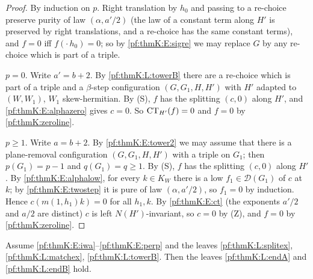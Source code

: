 \begin{proof}
By induction on $p$. Right translation by $h_0$ and passing to a re-choice preserve purity of law $(\alpha,a'/2)$ (the law
of a constant term along $H'$ is preserved by right translations, and a re-choice has the same constant terms), and $f=0$ iff
$f(\cdot\,h_0)=0$; so by \ref{pf:thmK:E:sigre} we may replace $G$ by any re-choice which is part of a triple.

$p=0$. Write $a'=b+2$. By \ref{pf:thmK:L:towerB} there are a re-choice which is part of a triple and a $\beta$-step
configuration $(G,G_1,H,H')$ with $H'$ adapted to $(W,W_1)$, $W_1$ skew-hermitian. By (S), $f$ has the splitting $(c,0)$ along
$H'$, and \ref{pf:thmK:E:alphazero} gives $c=0$. So $\operatorname{CT}_{H'}(f)=0$ and $f=0$ by \cref{pf:thmK:zeroline}.

$p\ge1$. Write $a=b+2$. By \ref{pf:thmK:E:tower2} we may assume that there is a plane-removal configuration $(G,G_1,H,H')$
with a triple on $G_1$; then $p(G_1)=p-1$ and $q(G_1)=q\ge1$. By (S), $f$ has the splitting $(c,0)$ along $H'$. By
\ref{pf:thmK:E:alphalow}, for every $k\in K_W$ there is a low $f_1\in\mathcal D(G_1)$ of $c$ at $k$; by
\ref{pf:thmK:E:twostep} it is pure of law $(\alpha,a'/2)$, so $f_1=0$ by induction. Hence $c(m(1,h_1)k)=0$ for all $h_1,k$.
By \ref{pf:thmK:E:ct} (the exponents $a'/2$ and $a/2$ are distinct) $c$ is left $N(H')$-invariant, so $c=0$ by (Z), and
$f=0$ by \cref{pf:thmK:zeroline}.
\end{proof}

\begin{proposition}\label{pf:thmK:endAB}
Assume \ref{pf:thmK:E:iwa}--\ref{pf:thmK:E:perp} and the leaves \ref{pf:thmK:L:splitex}, \ref{pf:thmK:L:matchex},
\ref{pf:thmK:L:towerB}. Then the leaves \ref{pf:thmK:L:endA} and \ref{pf:thmK:L:endB} hold.
\end{proposition}

